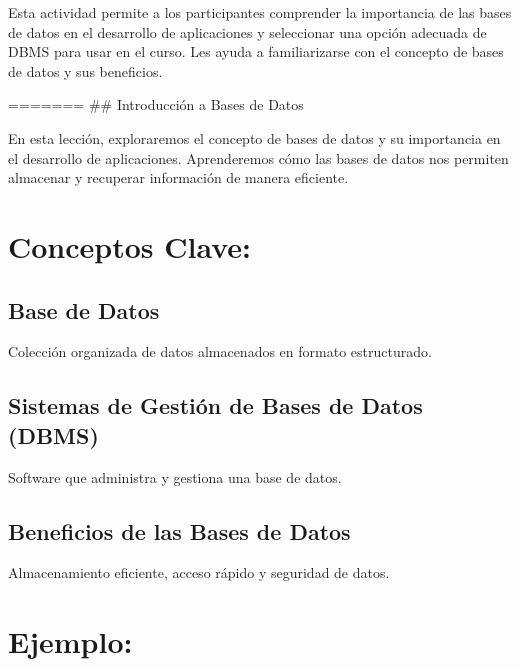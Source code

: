 \documentclass[
  a4paper,
  onepage,
  openany]{scrreprt}
\begin{document}
Esta actividad permite a los participantes comprender la importancia de
las bases de datos en el desarrollo de aplicaciones y seleccionar una
opción adecuada de DBMS para usar en el curso. Les ayuda a
familiarizarse con el concepto de bases de datos y sus beneficios.

======= \#\# Introducción a Bases de Datos

En esta lección, exploraremos el concepto de bases de datos y su
importancia en el desarrollo de aplicaciones. Aprenderemos cómo las
bases de datos nos permiten almacenar y recuperar información de manera
eficiente.

\hypertarget{conceptos-clave-61}{%
\section{Conceptos Clave:}\label{conceptos-clave-61}}

\hypertarget{base-de-datos-1}{%
\subsection{Base de Datos}\label{base-de-datos-1}}

Colección organizada de datos almacenados en formato estructurado.

\hypertarget{sistemas-de-gestiuxf3n-de-bases-de-datos-dbms-1}{%
\subsection{Sistemas de Gestión de Bases de Datos
(DBMS)}\label{sistemas-de-gestiuxf3n-de-bases-de-datos-dbms-1}}

Software que administra y gestiona una base de datos.

\hypertarget{beneficios-de-las-bases-de-datos-1}{%
\subsection{Beneficios de las Bases de
Datos}\label{beneficios-de-las-bases-de-datos-1}}

Almacenamiento eficiente, acceso rápido y seguridad de datos.

\hypertarget{ejemplo-63}{%
\section{Ejemplo:}\label{ejemplo-63}}
\end{document}
